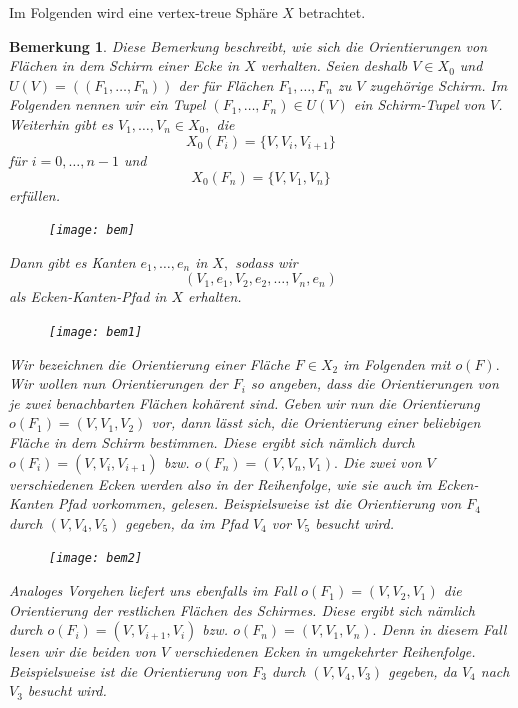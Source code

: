 \documentclass[12pt,titlepage,twoside,cleardoublepage]{article}
\theoremstyle{nummermitklammern}
\newtheorem{bemerkung}[temp]{Bemerkung}
\newtheorem{bemerkung}[zahl]{Bemerkung}
\numberwithin{equation}{section}
\begin{document}
Im Folgenden wird eine vertex-treue Sphäre $X$ betrachtet.
\begin{bemerkung}
Diese Bemerkung beschreibt, wie sich die Orientierungen von Flächen in dem Schirm einer Ecke in $X$ verhalten.
 Seien deshalb $V\in X_0$ und $U(V)=((F_1,\ldots,F_n))$ der für Flächen $F_1,\ldots,F_n$ zu $V$ zugehörige Schirm. Im Folgenden nennen wir ein Tupel $(F_1,\ldots,F_n)\in U(V)$ ein \emph{Schirm-Tupel} von $V$. Weiterhin gibt es $V_1,\ldots,V_n\in X_0,$ die 
\[
X_0(F_i)=\{V,V_i,V_{i+1}\}
\] 
für $i=0,\ldots,n-1$ und 
\[
X_0(F_n)=\{V,V_{1},V_{n}\}
\] erfüllen.
\begin{figure}[H]
\begin{center}
\texttt{[image: bem]}
\end{center}
\end{figure}
Dann gibt es Kanten $e_1,\ldots,e_n$ in $X,$ sodass wir 
\[
(V_1,e_1,V_2,e_2,\ldots,V_n,e_n)
\] 
als Ecken-Kanten-Pfad in $X$ erhalten. 
\begin{figure}[H]
\begin{center}
\texttt{[image: bem1]}
\end{center}
\end{figure}
Wir bezeichnen die Orientierung einer Fläche $F\in X_2$ im Folgenden mit $o(F).$ Wir wollen nun Orientierungen der $F_i$ so angeben, dass die Orientierungen von je zwei benachbarten Flächen kohärent sind. 
Geben wir nun die Orientierung $o(F_1)=(V,V_1,V_2)$ vor, dann lässt sich, die Orientierung einer beliebigen Fläche in dem Schirm bestimmen. Diese ergibt sich nämlich durch $o(F_i)=(V,V_i,V_{i+1})$ bzw. $o(F_n)=(V,V_n,V_1).$ Die zwei von $V$ verschiedenen Ecken werden also in der Reihenfolge, wie sie auch im Ecken-Kanten Pfad vorkommen, gelesen. Beispielsweise ist die Orientierung von $F_4$ durch $(V,V_4,V_5)$ gegeben, da im Pfad $V_4$ vor $V_5 $ besucht wird. 
\begin{figure}[H]
\begin{center}
\texttt{[image: bem2]}
\end{center}
\end{figure}
Analoges Vorgehen liefert uns ebenfalls im Fall $o(F_1)=(V,V_2,V_1)$ die Orientierung der restlichen Flächen des Schirmes. Diese ergibt sich nämlich durch $o(F_i)=(V,V_{i+1},V_{i})$ bzw. $o(F_n)=(V,V_1,V_n).$ Denn in diesem Fall lesen wir die beiden von $V$ verschiedenen Ecken in umgekehrter Reihenfolge. Beispielsweise ist die Orientierung von $F_3$ durch $(V,V_4,V_3)$ gegeben, da $V_4$ nach $V_3$ besucht wird.

\end{bemerkung}
\end{document}
